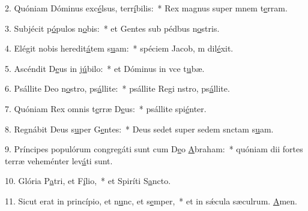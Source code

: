 2. Quóniam Dóminus exc\uline{é}lsus, terr\uline{í}bilis:~* Rex magnus super mnem t\uline{e}rram.\par 
3. Subjécit p\uline{ó}pulos n\uline{o}bis:~* et Gentes sub pédbus n\uline{o}stris.\par 
4. Elégit nobis heredit\uline{á}tem s\uline{u}am:~* spéciem Jacob, m dil\uline{é}xit.\par 
5. Ascéndit D\uline{e}us in j\uline{ú}bilo:~* et Dóminus in vce t\uline{u}bæ.\par 
6. Psállite Deo n\uline{o}stro, ps\uline{á}llite:~* psállite Regi nstro, ps\uline{á}llite.\par 
7. Quóniam Rex omnis t\uline{e}rræ D\uline{e}us:~* psállite spi\uline{é}nter.\par 
8. Regnábit Deus s\uline{u}per G\uline{e}ntes:~* Deus sedet super sedem snctam s\uline{u}am.\par 
9. Príncipes populórum congregáti sunt cum D\uline{e}o \uline{A}braham:~* quóniam dii fortes terræ veheménter lev\uline{á}ti sunt.\par 
10. Glória P\uline{a}tri, et F\uline{í}lio,~* et Spiríti S\uline{a}ncto.\par 
11. Sicut erat in princípio, et n\uline{u}nc, et s\uline{e}mper,~* et in sǽcula sæculrum. \uline{A}men.\par 
